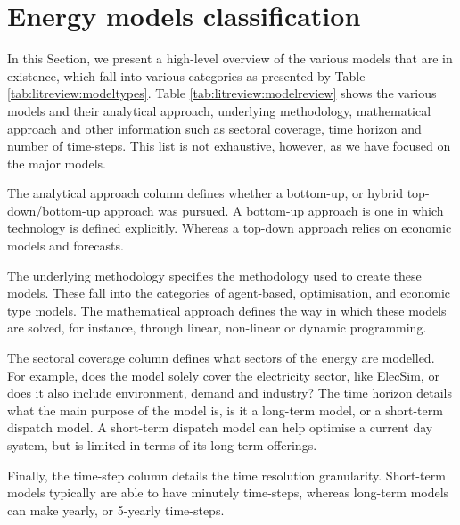 \section{Energy models classification}
\label{sec:litreview:modelclassification}

In this Section, we present a high-level overview of the various models that are in existence, which fall into various categories as presented by Table \ref{tab:litreview:modeltypes}. Table \ref{tab:litreview:modelreview} shows the various models and their analytical approach, underlying methodology, mathematical approach and other information such as sectoral coverage, time horizon and number of time-steps. This list is not exhaustive, however, as we have focused on the major models. 

The analytical approach column defines whether a bottom-up, or hybrid top-down/bottom-up approach was pursued. A bottom-up approach is one in which technology is defined explicitly. Whereas a top-down approach relies on economic models and forecasts.

The underlying methodology specifies the methodology used to create these models. These fall into the categories of agent-based, optimisation, and economic type models. The mathematical approach defines the way in which these models are solved, for instance, through linear, non-linear or dynamic programming.

The sectoral coverage column defines what sectors of the energy are modelled. For example, does the model solely cover the electricity sector, like ElecSim, or does it also include environment, demand and industry? The time horizon details what the main purpose of the model is, is it a long-term model, or a short-term dispatch model. A short-term dispatch model can help optimise a current day system, but is limited in terms of its long-term offerings. 

Finally, the time-step column details the time resolution granularity. Short-term models typically are able to have minutely time-steps, whereas long-term models can make yearly, or 5-yearly time-steps.


